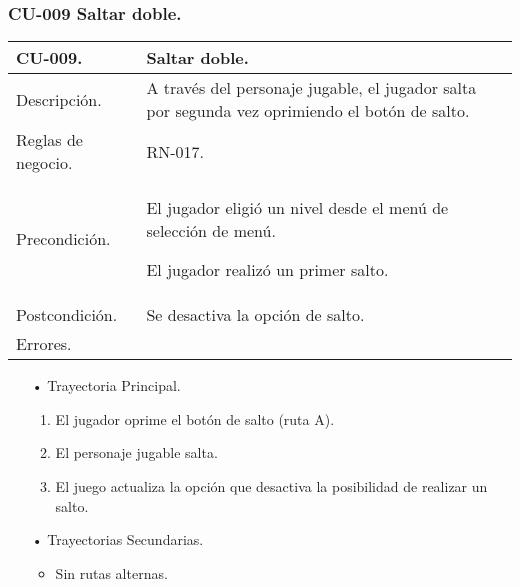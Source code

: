 \subsubsection{CU-009 Saltar doble.} \label{CU:09}
\begin{longtable}[c]{ | m{5cm} | m{10cm}|} 
		\hline
		\rowcolor{cyan}CU-009. & Saltar doble.\\ 
		\hline
		Descripción. & A través del personaje jugable, el jugador salta por segunda vez oprimiendo el botón de salto. \\ 
		\hline
		Reglas de negocio. & RN-017.\\ 
		\hline
		Precondición. & El jugador eligió un nivel desde el menú de selección de menú.
		\par
	El jugador realizó un primer salto.\\
		\hline
		Postcondición. & Se desactiva la opción de salto.\\
		\hline
		Errores. & \\
		\hline
\end{longtable}

\begin{itemize}
	\item[•] Trayectoria Principal.
		\begin{enumerate}
			\item El jugador oprime el botón de salto (ruta A).
			\item El personaje jugable salta.
			\item El juego actualiza la opción que desactiva la posibilidad de realizar un salto.
		\end{enumerate}
	\item[•] Trayectorias Secundarias.
		\begin{itemize}
			\item Sin rutas alternas.
		\end{itemize}
\end{itemize}